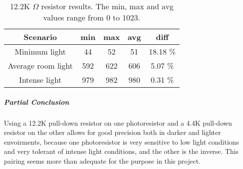 \begin{table}[htbp]
  \centering
  \begin{tabular}{c c c c c}
    \toprule
    Scenario & min & max & avg & diff \\ \midrule
    Minimum light & 44 & 52 & 51 & 18.18 \% \\
    Average room light & 592 & 622 & 606 & 5.07 \% \\
    Intense light & 979 & 982 & 980 & 0.31 \% \\ \bottomrule
  \end{tabular}
  \caption[12.2K $\Omega$ resistor results]{12.2K $\Omega$ resistor results. The min, max and avg values range from 0 to 1023.}\label{tab:12.2KTestResults}
\end{table}

\subparagraph{Partial Conclusion}
Using a 12.2K pull-down resistor on one photoresistor and a 4.4K pull-down resistor on the other allows for good precision both in darker and lighter envoirments, because one photoresistor is very sensitive to low light conditions and very tolerant of intense light conditions, and the other is the inverse. This pairing seems more than adequate for the purpose in this project.
